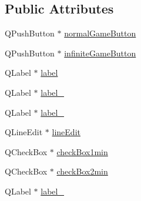 \subsection*{Public Attributes}
\begin{DoxyCompactItemize}
\item 
Q\-Push\-Button $\ast$ \hyperlink{class_ui___dialog_game_settings_a40ae5b6fb421789d7586b3f4988eada7}{normal\-Game\-Button}
\item 
Q\-Push\-Button $\ast$ \hyperlink{class_ui___dialog_game_settings_a283359b60692817ea7b7099dde4b5fd5}{infinite\-Game\-Button}
\item 
Q\-Label $\ast$ \hyperlink{class_ui___dialog_game_settings_a133d7ca29a48667080c9110ecbe2d700}{label}
\item 
Q\-Label $\ast$ \hyperlink{class_ui___dialog_game_settings_acd81adc6c389863807a80eaa648914fa}{label\-\_}
\item 
Q\-Label $\ast$ \hyperlink{class_ui___dialog_game_settings_a8d29fcac63609c2780a1ed61d40f7597}{label\-\_}
\item 
Q\-Line\-Edit $\ast$ \hyperlink{class_ui___dialog_game_settings_a742bcceb2e255a8dd0916aa91510a6ce}{line\-Edit}
\item 
Q\-Check\-Box $\ast$ \hyperlink{class_ui___dialog_game_settings_a2144e6c4c4c36806ab244689d5ad29b1}{check\-Box1min}
\item 
Q\-Check\-Box $\ast$ \hyperlink{class_ui___dialog_game_settings_af65933a6ca19450ec9d170436d7d4024}{check\-Box2min}
\item 
Q\-Label $\ast$ \hyperlink{class_ui___dialog_game_settings_a29b446cc3b25e8f886ffb8f3a3917ca9}{label\-\_}
\end{DoxyCompactItemize}


